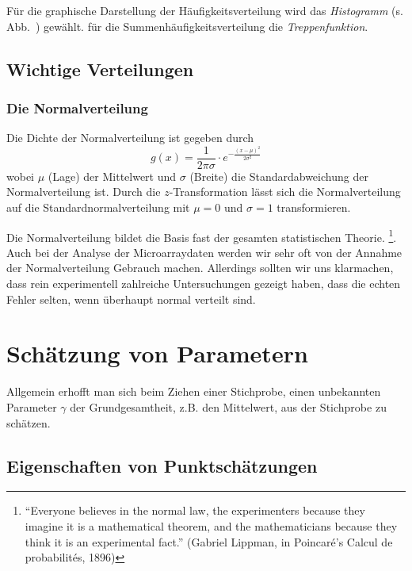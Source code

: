 F\"ur die graphische Darstellung der H\"aufigkeitsverteilung wird das {\em Histogramm} (s. Abb.~) gew\"ahlt. f\"ur die Summenh\"aufigkeitsverteilung die {\em Treppenfunktion}.

%
\subsection{Wichtige Verteilungen}

\subsubsection{Die Normalverteilung}
Die Dichte der Normalverteilung ist gegeben durch
\begin{equation}\label{dichtenormal}
g(x) = \frac{1}{2\pi\sigma}\cdot e^{-\frac{(x-\mu)^2}{2\sigma^2}}
\end{equation}
wobei $\mu$ (Lage) der Mittelwert und $\sigma$ (Breite) die Standardabweichung der Normalverteilung ist. 
Durch die $z$-Transformation l\"asst sich die Normalverteilung auf die Standardnormalverteilung mit $\mu=0$ und $\sigma=1$ transformieren.

Die Normalverteilung bildet die Basis fast der gesamten statistischen Theorie. \footnote{ 
``Everyone believes in the normal law, the experimenters because they imagine it is a mathematical theorem, and the mathematicians because they think it is an experimental fact.'' (Gabriel Lippman, in Poincar\'e's Calcul de probabilit\'es, 1896)}. Auch bei der Analyse der Microarraydaten werden wir sehr oft von der Annahme der Normalverteilung Gebrauch machen. Allerdings sollten wir uns klarmachen, dass  rein experimentell zahlreiche Untersuchungen gezeigt haben, dass die echten Fehler selten, wenn \"uberhaupt normal verteilt sind.


\section{Sch\"atzung von Parametern}
Allgemein erhofft man sich beim Ziehen einer Stichprobe, einen unbekannten Parameter $\gamma$ der Grundgesamtheit, z.B. den Mittelwert, aus der Stichprobe zu sch\"atzen.
\subsection{Eigenschaften von Punktsch\"atzungen}

